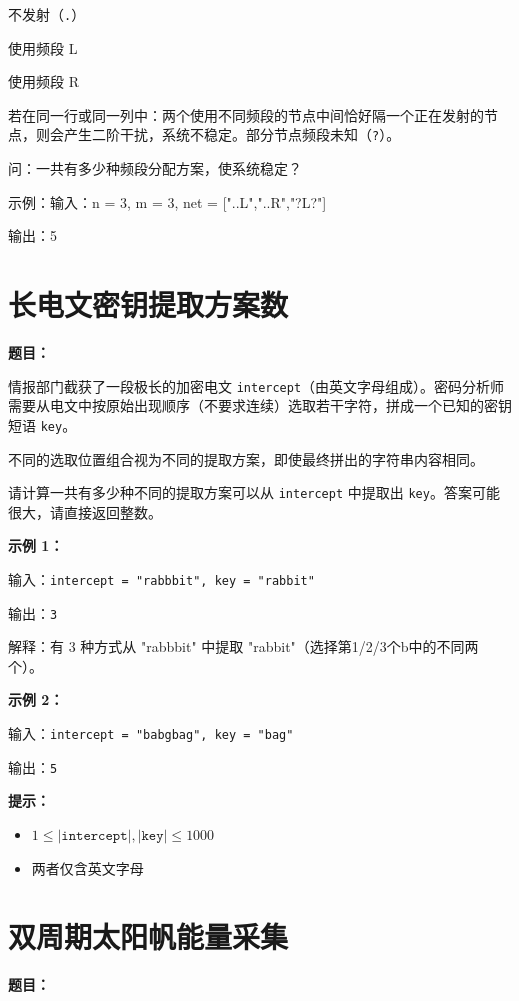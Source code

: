 \documentclass[12pt, a4paper]{article}
\begin{document}
不发射（\texttt{.}）

使用频段 L

使用频段 R

若在同一行或同一列中：两个使用不同频段的节点中间恰好隔一个正在发射的节点，则会产生二阶干扰，系统不稳定。部分节点频段未知（\texttt{?}）。

问：一共有多少种频段分配方案，使系统稳定？

示例：输入：n = 3, m = 3, net = ["..L","..R","?L?"]

输出：5



\section{长电文密钥提取方案数}

\noindent\textbf{题目：}

情报部门截获了一段极长的加密电文 \texttt{intercept}（由英文字母组成）。密码分析师需要从电文中按原始出现顺序（不要求连续）选取若干字符，拼成一个已知的密钥短语 \texttt{key}。

不同的选取位置组合视为不同的提取方案，即使最终拼出的字符串内容相同。

请计算一共有多少种不同的提取方案可以从 \texttt{intercept} 中提取出 \texttt{key}。答案可能很大，请直接返回整数。

\textbf{示例 1：}

输入：\texttt{intercept = "rabbbit", key = "rabbit"}

输出：\texttt{3}

解释：有 3 种方式从 "rabbbit" 中提取 "rabbit"（选择第1/2/3个b中的不同两个）。

\textbf{示例 2：}

输入：\texttt{intercept = "babgbag", key = "bag"}

输出：\texttt{5}

\textbf{提示：}
\begin{itemize}[leftmargin=2em]
  \item $1 \leq |\texttt{intercept}|, |\texttt{key}| \leq 1000$
  \item 两者仅含英文字母
\end{itemize}



\section{双周期太阳帆能量采集}

\noindent\textbf{题目：}
\end{document}
